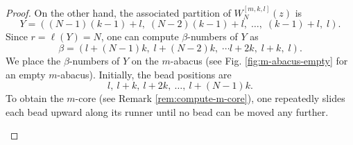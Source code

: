 \documentclass[preprint,3p,10pt]{elsarticle}
\theoremstyle{definition}
\begin{document}
\begin{proof}
On the other hand, the associated partition of \(W_N^{[m,k,l]}(z)\) is
\begin{equation}
Y=\left((N-1)(k-1)+l,\; (N-2)(k-1)+l,\; \ldots,\; (k-1)+l,\; l\right).
\end{equation}
Since \(r=\ell(Y)=N\), one can compute \(\beta\)-numbers of \(Y\) as
\begin{equation}\label{eqn:beta number for redefine WH polynomials}
\beta=(l+(N-1)k, \; l+(N-2)k, \; \cdots l+2k,\; l+k,\; l).
\end{equation}
We place the \(\beta\)-numbers of \(Y\) on the \(m\)-abacus (see Fig. \ref{fig:m-abacus-empty} for an empty \(m\)-abacus). Initially, the bead positions are
\begin{equation}
l,\ l+k,\ l+2k,\ \dots,\ l+(N-1)k.
\end{equation}
To obtain the \(m\)-core (see Remark \ref{rem:compute-m-core}), one repeatedly slides each bead upward along its runner until no bead can be moved any further. 

\begin{figure}[htbp]
\centering
{}
\end{figure}
\end{proof}
\end{document}
